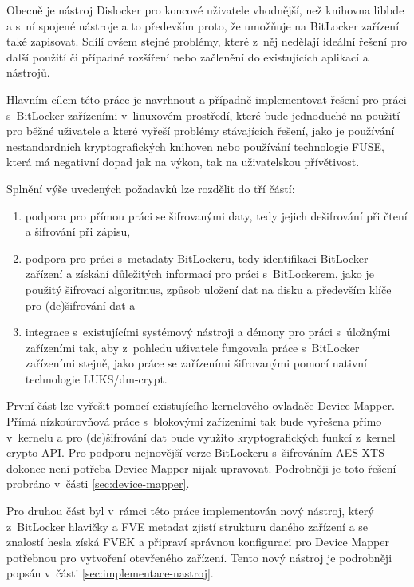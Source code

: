 Obecně je nástroj Dislocker pro koncové uživatele vhodnější, než knihovna libbde a s~ní spojené nástroje a to především proto, že umožňuje na BitLocker zařízení také zapisovat. Sdílí ovšem stejné problémy, které z~něj nedělají ideální řešení pro další použití či případné rozšíření nebo začlenění do existujících aplikací a nástrojů.




Hlavním cílem této práce je navrhnout a případně implementovat řešení pro práci s~BitLocker zařízeními v~linuxovém prostředí, které bude jednoduché na použití pro běžné uživatele a které vyřeší problémy stávajících řešení, jako je používání nestandardních kryptografických knihoven nebo používání technologie FUSE, která má negativní dopad jak na výkon, tak na uživatelskou přívětivost.

Splnění výše uvedených požadavků lze rozdělit do tří částí:

\begin{enumerate}
	\item podpora pro přímou práci se šifrovanými daty, tedy jejich dešifrování při čtení a šifrování při zápisu,
	\item podpora pro práci s~metadaty BitLockeru, tedy identifikaci BitLocker zařízení a získání důležitých informací pro práci s~BitLockerem, jako je použitý šifrovací algoritmus, způsob uložení dat na disku a především klíče pro (de)šifrování dat a
	\item integrace s~existujícími systémový nástroji a démony pro práci s~úložnými zařízeními tak, aby z~pohledu uživatele fungovala práce s~BitLocker zařízeními stej\-ně, jako práce se zařízeními šifrovanými pomocí nativní technologie LUKS/dm-crypt.
\end{enumerate}

První část lze vyřešit pomocí existujícího kernelového ovladače Device Mapper. Přímá nízkoúrovňová práce s~blokovými zařízeními tak bude vyřešena přímo v~kernelu a pro (de)šifrování dat bude využito kryptografických funkcí z~kernel crypto API. Pro podporu nejnovější verze BitLockeru s~šifrováním AES-XTS dokonce není potřeba Device Mapper nijak upravovat. Podrobněji je toto řešení probráno v~části \ref{sec:device-mapper}.

Pro druhou část byl v~rámci této práce implementován nový nástroj, který z~BitLocker hlavičky a FVE metadat zjistí strukturu daného zařízení a se znalostí hesla získá FVEK a připraví správnou konfiguraci pro Device Mapper potřebnou pro vytvoření otevřeného zařízení. Tento nový nástroj je podrobněji popsán v~části \ref{sec:implementace-nastroj}.


